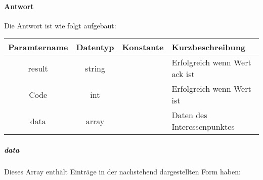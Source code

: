 \paragraph{Antwort}Die Antwort ist wie folgt aufgebaut:
\begin{table}[H]
	\begin{tabular}{|c|c|c|p{6.5cm}|}
		\hline
		\textbf{Paramtername} & \textbf{Datentyp} & \textbf{Konstante} & \textbf{Kurzbeschreibung}                                                                                               \\ \hline
		result              & string           &                 & Erfolgreich wenn Wert {\glqq ack\grqq} ist \\ \hline
		Code                & int              &                 & Erfolgreich wenn Wert {\glqq 0\grqq} ist \\ \hline
		data                & array            &                 & Daten des Interessenpunktes \\ \hline
	\end{tabular}
\end{table}
\subparagraph{data}Dieses Array enthält Einträge in der nachstehend dargestellten Form haben:
